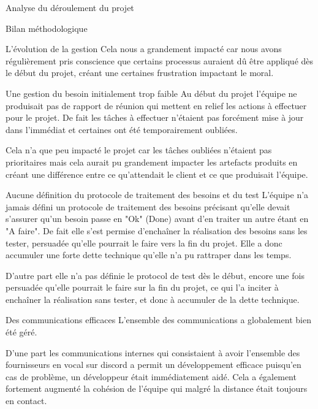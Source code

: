 \documentclass[]{article}
\begin{document}
{\begin{section}{Analyse du déroulement du projet}
\begin{subsection}{Bilan méthodologique}
\begin{subsubsection}{L'évolution de la gestion}
         Cela nous a grandement impacté car nous avons régulièrement pris conscience que certains processus auraient dû être appliqué dès le début du projet, créant une certaines frustration impactant le moral.
     \end{subsubsection}

     \begin{subsubsection}{Une gestion du besoin initialement trop faible}
         Au début du projet l'équipe ne produisait pas de rapport de réunion qui mettent en relief les actions à effectuer pour le projet. De fait les tâches à effectuer n'étaient pas forcément mise à jour dans l'immédiat et certaines ont été temporairement oubliées.

         Cela n'a que peu impacté le projet car les tâches oubliées n'étaient pas prioritaires mais cela aurait pu grandement impacter les artefacts produits en créant une différence entre ce qu'attendait le client et ce que produisait l'équipe.
     \end{subsubsection}

     \begin{subsubsection}{Aucune définition du protocole de traitement des besoins et du test}
         L'équipe n'a jamais défini un protocole de traitement des besoins précisant qu'elle devait s'assurer qu'un besoin passe en "Ok" (Done) avant d'en traiter un autre étant en "A faire". De fait elle s'est permise d'enchaîner la réalisation des besoins sans les tester, persuadée qu'elle pourrait le faire vers la fin du projet. Elle a donc accumuler une forte dette technique qu'elle n'a pu rattraper dans les temps.

         D'autre part elle n'a pas définie le protocol de test dès le début, encore une fois persuadée qu'elle pourrait le faire sur la fin du projet, ce qui l'a inciter à enchaîner la réalisation sans tester, et donc à accumuler de la dette technique.
     \end{subsubsection}

     \begin{subsubsection}{Des communications efficaces}
         L'ensemble des communications a globalement bien été géré.

         D'une part les communications internes qui consistaient à avoir l'ensemble des fournisseurs en vocal sur discord a permit un développement efficace puisqu'en cas de problème, un développeur était immédiatement aidé. Cela a également fortement augmenté la cohésion de l'équipe qui malgré la distance était toujours en contact.


\end{subsubsection}
\end{subsection}
\end{section}}
\end{document}
